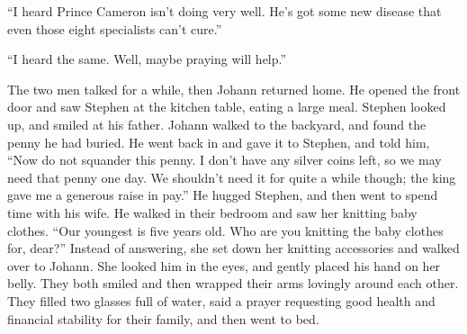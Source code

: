 “I heard Prince Cameron isn't doing very well. He's got some new disease that even those eight specialists can't cure.”

“I heard the same. Well, maybe praying will help.”

The two men talked for a while, then Johann returned home. He opened the front door and saw Stephen at the kitchen table, eating a large meal. Stephen looked up, and smiled at his father. Johann walked to the backyard, and found the penny he had buried. He went back in and gave it to Stephen, and told him, “Now do not squander this penny. I don't have any silver coins left, so we may need that penny one day. We shouldn't need it for quite a while though; the king gave me a generous raise in pay.” He hugged Stephen, and then went to spend time with his wife. He walked in their bedroom and saw her knitting baby clothes. “Our youngest is five years old. Who are you knitting the baby clothes for, dear?” Instead of answering, she set down her knitting accessories and walked over to Johann. She looked him in the eyes, and gently placed his hand on her belly. They both smiled and then wrapped their arms lovingly around each other. They filled two glasses full of water, said a prayer requesting good health and financial stability for their family, and then went to bed.